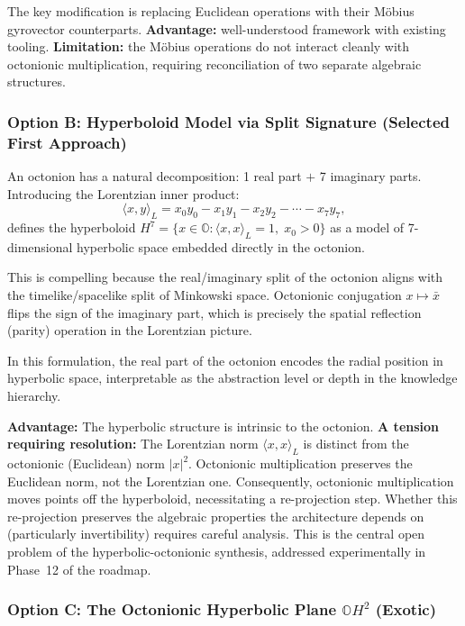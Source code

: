 \documentclass[11pt,a4paper]{article}
\newcommand{\Oct}{\mathbb{O}}
\begin{document}
The key modification is replacing Euclidean operations with their M\"{o}bius gyrovector counterparts. \textbf{Advantage:} well-understood framework with existing tooling. \textbf{Limitation:} the M\"{o}bius operations do not interact cleanly with octonionic multiplication, requiring reconciliation of two separate algebraic structures.

\subsubsection{Option B: Hyperboloid Model via Split Signature (Selected First Approach)}

An octonion has a natural decomposition: 1 real part $+$ 7 imaginary parts. Introducing the Lorentzian inner product:
\begin{equation}
\langle x, y \rangle_L = x_0 y_0 - x_1 y_1 - x_2 y_2 - \cdots - x_7 y_7,
\end{equation}
defines the hyperboloid $H^7 = \{ x \in \Oct : \langle x,x \rangle_L = 1,\; x_0 > 0 \}$ as a model of 7-dimensional hyperbolic space embedded directly in the octonion.

This is compelling because the real/imaginary split of the octonion aligns with the timelike/spacelike split of Minkowski space. Octonionic conjugation $x \mapsto \bar{x}$ flips the sign of the imaginary part, which is precisely the spatial reflection (parity) operation in the Lorentzian picture.

In this formulation, the real part of the octonion encodes the radial position in hyperbolic space, interpretable as the abstraction level or depth in the knowledge hierarchy.

\textbf{Advantage:} The hyperbolic structure is intrinsic to the octonion. \textbf{A tension requiring resolution:} The Lorentzian norm $\langle x,x \rangle_L$ is distinct from the octonionic (Euclidean) norm $\lvert x \rvert^2$. Octonionic multiplication preserves the Euclidean norm, not the Lorentzian one. Consequently, octonionic multiplication moves points off the hyperboloid, necessitating a re-projection step. Whether this re-projection preserves the algebraic properties the architecture depends on (particularly invertibility) requires careful analysis. This is the central open problem of the hyperbolic-octonionic synthesis, addressed experimentally in Phase~12 of the roadmap.

\subsubsection{Option C: The Octonionic Hyperbolic Plane \texorpdfstring{$\Oct H^2$}{OH2} (Exotic)}
\end{document}
